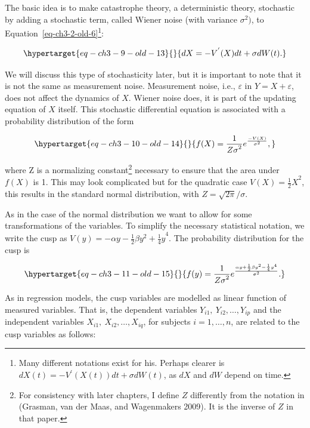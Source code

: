 \documentclass[
  a4paper,
  DIV=11,
  numbers=noendperiod,
  oneside]{scrreprt}
\begin{document}
The basic idea is to make catastrophe theory, a deterministic theory,
stochastic by adding a stochastic term, called Wiener noise (with
variance \(\sigma^{2})\), to Equation~\ref{eq-ch3-2-old-6}\footnote{Many
  different notations exist for his. Perhaps clearer is
  \(dX(t) = - V^{'}\left( X(t) \right)dt + \sigma dW(t)\), as \(dX\) and
  \(dW\) depend on time.}:

\begin{equation}\protect\hypertarget{eq-ch3-9-old-13}{}{
dX = - V^{'}(X)dt + \sigma dW(t).}\label{eq-ch3-9-old-13}\end{equation}

We will discuss this type of stochasticity later, but it is important to
note that it is not the same as measurement noise. Measurement noise,
i.e., \(\varepsilon\) in \(Y = X + \varepsilon\), does not affect the
dynamics of \(X\). Wiener noise does, it is part of the updating
equation of \(X\) itself. This stochastic differential equation is
associated with a probability distribution of the form

\begin{equation}\protect\hypertarget{eq-ch3-10-old-14}{}{
f(X) = \frac{1}{{Z\sigma}^{2}}e^{\frac{- V(X)}{\sigma^{2}}},}\label{eq-ch3-10-old-14}\end{equation}

where Z is a normalizing constant\footnote{For consistency with later
  chapters, I define \(Z\) differently from the notation in (Grasman,
  van der Maas, and Wagenmakers 2009). It is the inverse of \(Z\) in
  that paper.} necessary to ensure that the area under \(f(X)\) is 1.
This may look complicated but for the quadratic case
\(V(X) = {\frac{1}{2}X}^{2}\), this results in the standard normal
distribution, with \(Z = {\sqrt{2\pi}}/{\sigma}\).

As in the case of the normal distribution we want to allow for some
transformations of the variables. To simplify the necessary statistical
notation, we write the cusp as
\(V(y) = {- \alpha y - \frac{1}{2}\beta y^{2} + \frac{1}{4}y}^{4}\). The
probability distribution for the cusp is

\begin{equation}\protect\hypertarget{eq-ch3-11-old-15}{}{
f(y) = \frac{1}{{Z\sigma}^{2}}e^{\frac{\alpha y + \frac{1}{2}\beta y^{2} - \frac{1}{4}y^{4}}{\sigma^{2}}}.}\label{eq-ch3-11-old-15}\end{equation}

As in regression models, the cusp variables are modelled as linear
function of measured variables. That is, the dependent variables
\(Y_{i1},\ Y_{i2},\ldots,Y_{ip}\) and the independent variables
\(X_{i1},\ X_{i2},\ldots,X_{iq}\), for subjects \(i = 1,\ldots,n\), are
related to the cusp variables as follows:
\end{document}
